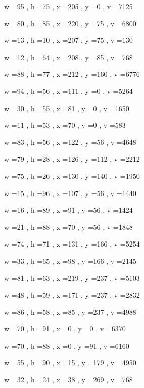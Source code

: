\documentclass[11pt]{article}
\begin{document}
w =95 , h =75 , x =205 , y =0 , v =7125
\par
w =80 , h =85 , x =220 , y =75 , v =6800
\par
w =13 , h =10 , x =207 , y =75 , v =130
\par
w =12 , h =64 , x =208 , y =85 , v =768
\par
w =88 , h =77 , x =212 , y =160 , v =6776
\par
w =94 , h =56 , x =111 , y =0 , v =5264
\par
w =30 , h =55 , x =81 , y =0 , v =1650
\par
w =11 , h =53 , x =70 , y =0 , v =583
\par
w =83 , h =56 , x =122 , y =56 , v =4648
\par
w =79 , h =28 , x =126 , y =112 , v =2212
\par
w =75 , h =26 , x =130 , y =140 , v =1950
\par
w =15 , h =96 , x =107 , y =56 , v =1440
\par
w =16 , h =89 , x =91 , y =56 , v =1424
\par
w =21 , h =88 , x =70 , y =56 , v =1848
\par
w =74 , h =71 , x =131 , y =166 , v =5254
\par
w =33 , h =65 , x =98 , y =166 , v =2145
\par
w =81 , h =63 , x =219 , y =237 , v =5103
\par
w =48 , h =59 , x =171 , y =237 , v =2832
\par
w =86 , h =58 , x =85 , y =237 , v =4988
\par
w =70 , h =91 , x =0 , y =0 , v =6370
\par
w =70 , h =88 , x =0 , y =91 , v =6160
\par
w =55 , h =90 , x =15 , y =179 , v =4950
\par
w =32 , h =24 , x =38 , y =269 , v =768
\par
\newpage


\end{document}
